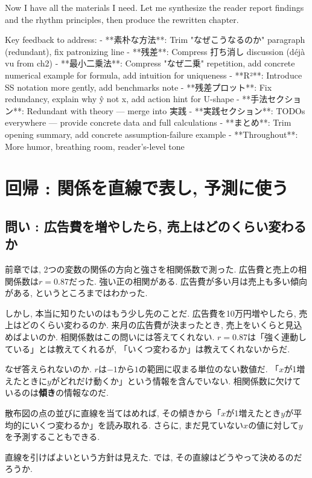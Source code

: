 ﻿Now I have all the materials I need. Let me synthesize the reader report findings and the rhythm principles, then produce the rewritten chapter.

Key feedback to address:
- **素朴な方法**: Trim "なぜこうなるのか" paragraph (redundant), fix patronizing line
- **残差**: Compress 打ち消し discussion (déjà vu from ch2)
- **最小二乗法**: Compress "なぜ二乗" repetition, add concrete numerical example for formula, add intuition for uniqueness
- **R²**: Introduce SS notation more gently, add benchmarks note
- **残差プロット**: Fix redundancy, explain why ŷ not x, add action hint for U-shape
- **手法セクション**: Redundant with theory — merge into 実践
- **実践セクション**: TODOs everywhere — provide concrete data and full calculations
- **まとめ**: Trim opening summary, add concrete assumption-failure example
- **Throughout**: More humor, breathing room, reader's-level tone

\section{回帰 : 関係を直線で表し, 予測に使う}

\subsection{問い : 広告費を増やしたら, 売上はどのくらい変わるか}

前章では, 2つの変数の関係の方向と強さを相関係数で測った.
広告費と売上の相関係数は$r = 0.87$だった.
強い正の相関がある. 広告費が多い月は売上も多い傾向がある, というところまではわかった.

しかし, 本当に知りたいのはもう少し先のことだ.
広告費を10万円増やしたら, 売上はどのくらい変わるのか.
来月の広告費が決まったとき, 売上をいくらと見込めばよいのか.
相関係数はこの問いには答えてくれない.
$r = 0.87$は「強く連動している」とは教えてくれるが, 「いくつ変わるか」は教えてくれないからだ.

なぜ答えられないのか.
$r$は$-1$から$1$の範囲に収まる単位のない数値だ.
「$x$が1増えたときに$y$がどれだけ動くか」という情報を含んでいない.
相関係数に欠けているのは\textbf{傾き}の情報なのだ.

散布図の点の並びに直線を当てはめれば, その傾きから「$x$が1増えたとき$y$が平均的にいくつ変わるか」を読み取れる.
さらに, まだ見ていない$x$の値に対して$y$を予測することもできる.

直線を引けばよいという方針は見えた.
では, その直線はどうやって決めるのだろうか.


